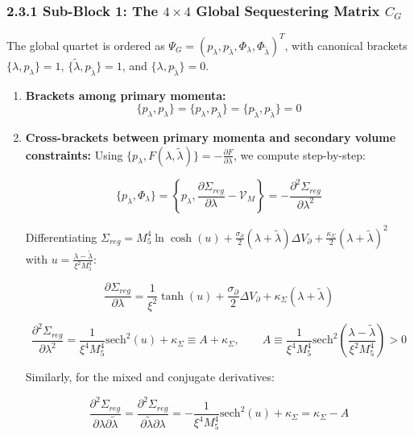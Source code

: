 \documentclass[aps,prd,onecolumn,superscriptaddress,nofootinbib,longbibliography,10pt]{revtex4-2}
\begin{document}
  
\subsubsection*{2.3.1 Sub-Block 1: The \(4 \times 4\) Global Sequestering Matrix \(C_G\)}

  The global quartet is ordered as \(\Psi_G = (p_\lambda, p_{\tilde{\lambda}}, \Phi_\lambda, \Phi_{\tilde{\lambda}})^T\), with canonical brackets \(\{\lambda, p_\lambda\} = 1\), \(\{\tilde{\lambda}, p_{\tilde{\lambda}}\} = 1\), and \(\{\lambda, p_{\tilde{\lambda}}\} = 0\).


  
\begin{enumerate}
    
\item \textbf{Brackets among primary momenta:}
    \[ \{p_\lambda, p_\lambda\} = \{p_\lambda, p_{\tilde{\lambda}}\} = \{p_{\tilde{\lambda}}, p_{\tilde{\lambda}}\} = 0 \]
    
\item \textbf{Cross-brackets between primary momenta and secondary volume constraints:} Using \(\{p_\lambda, F(\lambda,\tilde{\lambda})\} = -\frac{\partial F}{\partial\lambda}\), we compute step-by-step:


\[\{p_\lambda, \Phi_\lambda\} = \left\{ p_\lambda, \frac{\partial\Sigma_{reg}}{\partial\lambda} - \mathcal{V}_M \right\} = -\frac{\partial^2\Sigma_{reg}}{\partial\lambda^2}\]


Differentiating \(\Sigma_{reg} = M_5^4\ln\cosh(u) + \frac{\sigma_\partial}{2}(\lambda + \tilde{\lambda})\Delta V_\partial + \frac{\kappa_\Sigma}{2}(\lambda + \tilde{\lambda})^2\) with \(u = \frac{\lambda - \tilde{\lambda}}{\xi^2 M_5^4}\):


\[\frac{\partial\Sigma_{reg}}{\partial\lambda} = \frac{1}{\xi^2}\tanh(u) + \frac{\sigma_\partial}{2}\Delta V_\partial + \kappa_\Sigma(\lambda + \tilde{\lambda})\]


\[\frac{\partial^2\Sigma_{reg}}{\partial\lambda^2} = \frac{1}{\xi^4 M_5^4}\text{sech}^2(u) + \kappa_\Sigma \equiv A + \kappa_\Sigma, \qquad A \equiv \frac{1}{\xi^4 M_5^4}\text{sech}^2\left(\frac{\lambda - \tilde{\lambda}}{\xi^2 M_5^4}\right) > 0\]


Similarly, for the mixed and conjugate derivatives:


\[\frac{\partial^2\Sigma_{reg}}{\partial\lambda\partial\tilde{\lambda}} = \frac{\partial^2\Sigma_{reg}}{\partial\tilde{\lambda}\partial\lambda} = -\frac{1}{\xi^4 M_5^4}\text{sech}^2(u) + \kappa_\Sigma = \kappa_\Sigma - A\]



\end{enumerate}
\end{document}
